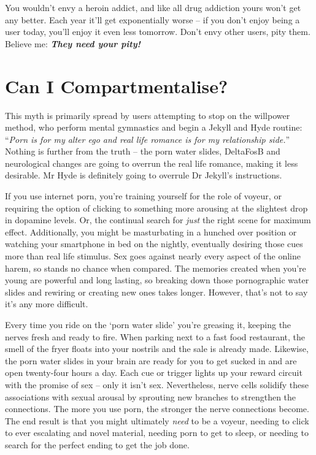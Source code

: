 \documentclass[
]{book}
\begin{document}
You wouldn't envy a heroin addict, and like all drug addiction yours won't get any better. Each year it'll get exponentially worse -- if you don't enjoy being a user today, you'll enjoy it even less tomorrow. Don't envy other users, pity them. Believe me: \textbf{\emph{They need your pity!}}

\hypertarget{can-i-compartmentalise}{%
\chapter{Can I Compartmentalise?}\label{can-i-compartmentalise}}

This myth is primarily spread by users attempting to stop on the willpower method, who perform mental gymnastics and begin a Jekyll and Hyde routine: ``\emph{Porn is for my alter ego and real life romance is for my relationship side.}'' Nothing is further from the truth -- the porn water slides, DeltaFosB and neurological changes are going to overrun the real life romance, making it less desirable. Mr Hyde is definitely going to overrule Dr Jekyll's instructions.

If you use internet porn, you're training yourself for the role of voyeur, or requiring the option of clicking to something more arousing at the slightest drop in dopamine levels. Or, the continual search for \emph{just} the right scene for maximum effect. Additionally, you might be masturbating in a hunched over position or watching your smartphone in bed on the nightly, eventually desiring those cues more than real life stimulus. Sex goes against nearly every aspect of the online harem, so stands no chance when compared. The memories created when you're young are powerful and long lasting, so breaking down those pornographic water slides and rewiring or creating new ones takes longer. However, that's not to say it's any more difficult.

Every time you ride on the `porn water slide' you're greasing it, keeping the nerves fresh and ready to fire. When parking next to a fast food restaurant, the smell of the fryer floats into your nostrils and the sale is already made. Likewise, the porn water slides in your brain are ready for you to get sucked in and are open twenty-four hours a day. Each cue or trigger lights up your reward circuit with the promise of sex -- only it isn't sex. Nevertheless, nerve cells solidify these associations with sexual arousal by sprouting new branches to strengthen the connections. The more you use porn, the stronger the nerve connections become. The end result is that you might ultimately \emph{need} to be a voyeur, needing to click to ever escalating and novel material, needing porn to get to sleep, or needing to search for the perfect ending to get the job done.
\end{document}
